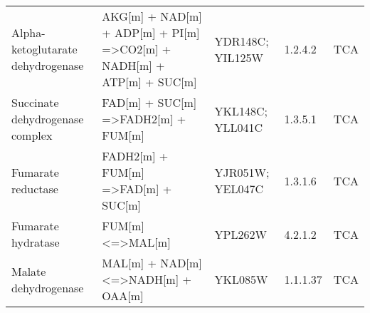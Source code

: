 \begin{table}[H]
\begin{center}
{\begin{tabular}{p{11cm}p{17cm}p{8cm}lp{5cm}}
Alpha-ketoglutarate dehydrogenase                                                         & AKG{[}m{]} + NAD{[}m{]} + ADP{[}m{]} + PI{[}m{]} =\textgreater CO2{[}m{]} + NADH{[}m{]} + ATP{[}m{]} + SUC{[}m{]}                               & YDR148C; YIL125W                                                                                                                                                 & 1.2.4.2            & TCA                                                                         \\
Succinate dehydrogenase complex                                                           & FAD{[}m{]} + SUC{[}m{]} =\textgreater FADH2{[}m{]} + FUM{[}m{]}                                                                                 & YKL148C; YLL041C                                                                                                                                                 & 1.3.5.1            & TCA                                                                         \\
Fumarate reductase                                                                        & FADH2{[}m{]} + FUM{[}m{]} =\textgreater FAD{[}m{]} + SUC{[}m{]}                                                                                 & YJR051W; YEL047C                                                                                                                                                 & 1.3.1.6            & TCA                                                                         \\
Fumarate hydratase                                                                        & FUM{[}m{]} \textless{}=\textgreater MAL{[}m{]}                                                                                                  & YPL262W                                                                                                                                                          & 4.2.1.2            & TCA                                                                         \\
Malate dehydrogenase                                                                      & MAL{[}m{]} + NAD{[}m{]} \textless{}=\textgreater NADH{[}m{]} + OAA{[}m{]}                                                                       & YKL085W                                                                                                                                                          & 1.1.1.37           & TCA                                                                         \\

\end{tabular}}
\end{center}
\end{table}

